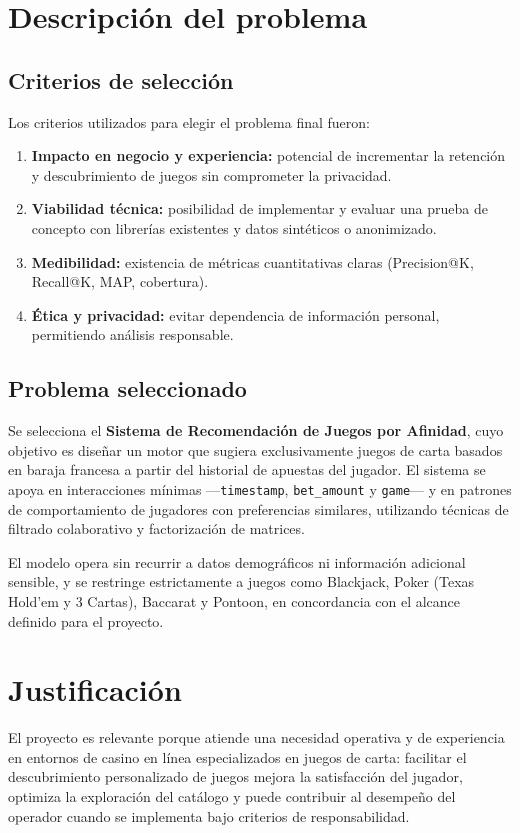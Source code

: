 \documentclass[12pt,a4paper]{article}
\begin{document}
\section{Descripción del problema}
\subsection{Criterios de selección}
Los criterios utilizados para elegir el problema final fueron:
\begin{enumerate}[leftmargin=*]
    \item \textbf{Impacto en negocio y experiencia:} potencial de incrementar la retención y descubrimiento de juegos sin comprometer la privacidad.
    \item \textbf{Viabilidad técnica:} posibilidad de implementar y evaluar una prueba de concepto con librerías existentes y datos sintéticos o anonimizado.
    \item \textbf{Medibilidad:} existencia de métricas cuantitativas claras (Precision@K, Recall@K, MAP, cobertura).
    \item \textbf{Ética y privacidad:} evitar dependencia de información personal, permitiendo análisis responsable.
\end{enumerate}

\subsection{Problema seleccionado}
Se selecciona el \textbf{Sistema de Recomendación de Juegos por Afinidad}, cuyo objetivo es diseñar un motor que sugiera exclusivamente juegos de carta basados en baraja francesa a partir del historial de apuestas del jugador. El sistema se apoya en interacciones mínimas ---\texttt{timestamp}, \texttt{bet\_amount} y \texttt{game}--- y en patrones de comportamiento de jugadores con preferencias similares, utilizando técnicas de filtrado colaborativo y factorización de matrices.

El modelo opera sin recurrir a datos demográficos ni información adicional sensible, y se restringe estrictamente a juegos como Blackjack, Poker (Texas Hold'em y 3 Cartas), Baccarat y Pontoon, en concordancia con el alcance definido para el proyecto.

\section{Justificación}
El proyecto es relevante porque atiende una necesidad operativa y de experiencia en entornos de casino en línea especializados en juegos de carta: facilitar el descubrimiento personalizado de juegos mejora la satisfacción del jugador, optimiza la exploración del catálogo y puede contribuir al desempeño del operador cuando se implementa bajo criterios de responsabilidad.
\end{document}
